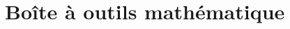 \documentclass[letterpaper,oneside,french]{book}
\begin{document}


% 


% 
% 
% 
% 
% 
% 
% 
% 
% 


\part{Boîte à outils mathématique}
\label{sec:math}








\nocite{*}
\newpage
%



\appendix




% 
\end{document}
